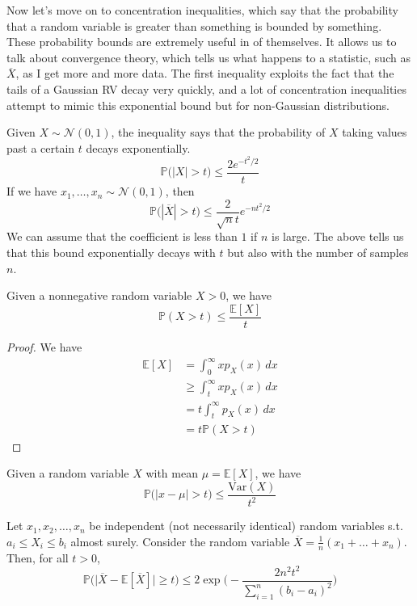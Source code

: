   Now let's move on to concentration inequalities, which say that the probability that a random variable is greater than something is bounded by something. These probability bounds are extremely useful in of themselves. It allows us to talk about convergence theory, which tells us what happens to a statistic, such as $\overline{X}$, as I get more and more data. The first inequality exploits the fact that the tails of a Gaussian RV decay very quickly, and a lot of concentration inequalities attempt to mimic this exponential bound but for non-Gaussian distributions. 

  \begin{theorem}
  Given $X \sim \mathcal{N}(0, 1)$, the inequality says that the probability of $X$ taking values past a certain $t$ decays exponentially. 
  \[\mathbb{P} \big( |X| > t \big) \leq \frac{2 e^{-t^2/2}}{t}\]
  If we have $x_1, \ldots, x_n \sim \mathcal{N}(0, 1)$, then 
  \[\mathbb{P} \big( |\overline{X}| > t \big) \leq \frac{2}{\sqrt{n} t} e^{-n t^2/2}\]
  We can assume that the coefficient is less than $1$ if $n$ is large. The above tells us that this bound exponentially decays with $t$ but also with the number of samples $n$. 
  \end{theorem}

  \begin{theorem}
  Given a nonnegative random variable $X > 0$, we have 
  \[\mathbb{P}(X > t) \leq \frac{\mathbb{E}[X]}{t}\]
  \end{theorem}
  \begin{proof}
  We have 
  \begin{align*}
      \mathbb{E}[X] & = \int_0^\infty x p_X (x)\,dx \\
      & \geq \int_t^\infty x p_X (x) \,dx \\
      & = t \int_t^\infty p_X (x) \,dx \\
      & = t \mathbb{P}(X > t)
  \end{align*}
  \end{proof}

  \begin{theorem}
  Given a random variable $X$ with mean $\mu = \mathbb{E}[X]$, we have 
  \[\mathbb{P}\big( |x - \mu| > t\big) \leq \frac{\mathrm{Var}(X)}{t^2}\]
  \end{theorem}

  \begin{theorem}
  Let $x_1, x_2, \ldots, x_n$ be independent (not necessarily identical) random variables s.t. $a_i \leq X_i \leq b_i$ almost surely. Consider the random variable $\overline{X} = \frac{1}{n} (x_1 + \ldots + x_n)$. Then, for all $t > 0$, 
  \[\mathbb{P}\big( \big| \overline{X} - \mathbb{E}[\overline{X}] \big| \geq t \big) \leq 2 \exp \bigg( -\frac{2 n^2 t^2}{\sum_{i=1}^n (b_i - a_i)^2} \bigg)\]
  \end{theorem}

